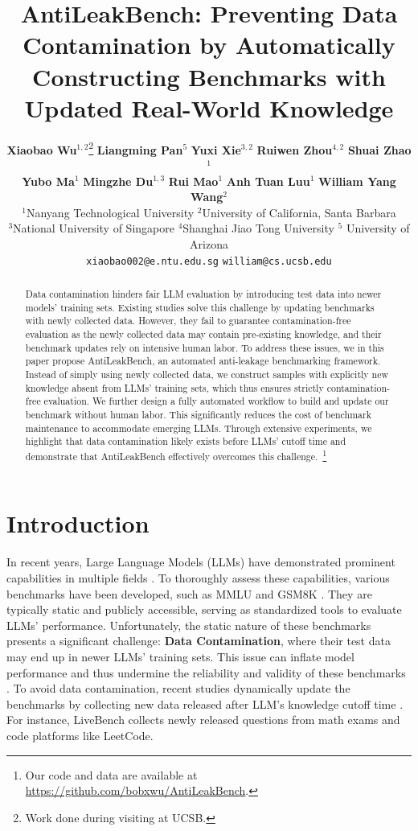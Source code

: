 \documentclass[11pt]{article}
\title{
    AntiLeakBench: Preventing Data Contamination by Automatically Constructing Benchmarks with Updated Real-World Knowledge
}
\author{
    \textbf{Xiaobao Wu}$^{1,2}$\thanks{Work done during visiting at UCSB.} \quad
    \textbf{Liangming Pan}$^5$ \quad
    \textbf{Yuxi Xie}$^{3,2}$\footnotemark[1] \quad
    \textbf{Ruiwen Zhou}$^{4,2}$\footnotemark[1] \quad
    \textbf{Shuai Zhao}$^1$ \\
    \textbf{Yubo Ma}$^1$ \quad
    \textbf{Mingzhe Du}$^{1,3}$ \quad
    \textbf{Rui Mao}$^1$ \quad
    \textbf{Anh Tuan Luu}$^1$ \quad
    \textbf{William Yang Wang}$^2$ \\
    $^1$Nanyang Technological University \quad $^2$University of California, Santa Barbara \\
    $^3$National University of Singapore \quad $^4$Shanghai Jiao Tong University \; $^5$ University of Arizona \\
    \texttt{xiaobao002@e.ntu.edu.sg} \quad
    \texttt{william@cs.ucsb.edu}
}
\begin{document}
\maketitle


\begin{abstract}
    Data contamination hinders fair LLM evaluation by introducing test data into newer models' training sets.
    Existing studies solve this challenge by updating benchmarks with newly collected data.
    However, they fail to guarantee contamination-free evaluation
    as the newly collected data may contain pre-existing knowledge,
    and their benchmark updates rely on intensive human labor.
    To address these issues, we in this paper propose AntiLeakBench, an automated anti-leakage benchmarking framework.
    Instead of simply using newly collected data,
    we construct samples with explicitly new knowledge absent from LLMs' training sets,
    which thus ensures strictly contamination-free evaluation.
    We further design a fully automated workflow to build and update our benchmark without human labor.
    This significantly reduces the cost of benchmark maintenance to accommodate emerging LLMs.
    Through extensive experiments, we highlight that data contamination likely exists before LLMs' cutoff time
    and demonstrate that AntiLeakBench effectively overcomes this challenge.~\footnote{Our code and data are available at \url{https://github.com/bobxwu/AntiLeakBench}.}
\end{abstract}


\section{Introduction}
    In recent years, Large Language Models (LLMs) have demonstrated prominent capabilities in multiple fields \cite{radford2019language,touvron2023llama}.
    To thoroughly assess these capabilities, various benchmarks have been developed, such as MMLU \cite{hendrycks2021mmlu} and GSM8K \cite{cobbe2021gsm8k}.
    They are typically static and publicly accessible, serving as standardized tools to evaluate LLMs' performance.
    Unfortunately, the static nature of these benchmarks presents a significant challenge: \textbf{Data Contamination},
    where their test data may end up in newer LLMs' training sets.
    This issue can inflate model performance and thus undermine the reliability and validity of these benchmarks \cite{golchin2023time,roberts2023cutoff,deng2024investigating,dong2024generalization,jiang2024investigating}.
    To avoid data contamination, recent studies dynamically update the benchmarks
    by collecting new data released after LLM's knowledge cutoff time
    \cite{kiela2021dynabench,potts2021dynasent,kasai2023realtime,jain2024livecodebench}.
    For instance, LiveBench \cite{white2024livebench} collects newly released questions from math exams and code platforms like LeetCode.
\end{document}
